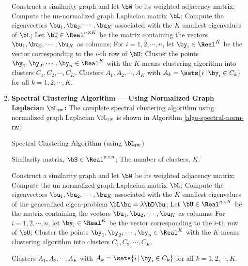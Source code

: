 \documentclass[12pt]{article}
\begin{document}
\begin{enumerate}[label=\textbf{\arabic*.}]
\begin{minipage}{\linewidth}
\begin{algorithm}[H]
\begin{algorithmic}[1]
				\STATE Construct a similarity graph and let $\bW$ be its weighted adjacency matrix; 
				\STATE Compute the un-normalized graph Laplacian matrix $\bL$; 
				\STATE Compute the eigenvectors $\bu_1, \bu_2, \cdots, \bu_K$ associated with the $K$ smallest eigenvalues of $\bL$; 
				\STATE Let $\bU \in \Real^{n \times K}$ be the matrix containing the vectors $\bu_1, \bu_2, \cdots, \bu_K$ as columns; 
				\STATE For $i = 1, 2, \cdots, n$, let $\by_i \in \Real^K$ be the vector corresponding to the $i$-th row of $\bU$; 
				\STATE Cluster the points $\by_1, \by_2, \cdots, \by_n \in \Real^K$ with the $K$-means clustering algorithm into clusters $C_1, C_2, \cdots, C_K$. 
				\RETURN Clusters $A_1, A_2, \cdots, A_K$ with $A_k = \sets{i \,\vert\, \by_i \in C_k}$ for all $k = 1, 2, \cdots, K$. 
			\end{algorithmic}
		\end{algorithm}
	\end{minipage}
	
	\item \textbf{Spectral Clustering Algorithm --- Using Normalized Graph Laplacian $\bL_{\mathrm{rw}}$:} The complete spectral clustering algorithm using normalized graph Laplacian $\bL_{\mathrm{rw}}$ is shown in Algorithm \ref{algo-spectral-norm-rw}. 
	
	\begin{minipage}{\linewidth}
		\begin{algorithm}[H]
		\caption{Spectral Clustering Algorithm (using $\bL_{\mathrm{rw}}$)}\label{algo-spectral-norm-rw}
			\begin{algorithmic}[1]
				\REQUIRE Similarity matrix, $\bS \in \Real^{n \times n}$; 
				\REQUIRE The number of clusters, $K$. 
				
				\STATE Construct a similarity graph and let $\bW$ be its weighted adjacency matrix; 
				\STATE Compute the un-normalized graph Laplacian matrix $\bL$; 
				\STATE Compute the eigenvectors $\bu_1, \bu_2, \cdots, \bu_K$ associated with the $K$ smallest eigenvalues of the generalized eigen-problem $\bL \bu = \lambda \bD \bu$; 
				\STATE Let $\bU \in \Real^{n \times K}$ be the matrix containing the vectors $\bu_1, \bu_2, \cdots, \bu_K$ as columns; 
				\STATE For $i = 1, 2, \cdots, n$, let $\by_i \in \Real^K$ be the vector corresponding to the $i$-th row of $\bU$; 
				\STATE Cluster the points $\by_1, \by_2, \cdots, \by_n \in \Real^K$ with the $K$-means clustering algorithm into clusters $C_1, C_2, \cdots, C_K$. 
				
				\RETURN Clusters $A_1, A_2, \cdots, A_K$ with $A_k = \sets{i \,\vert\, \by_i \in C_k}$ for all $k = 1, 2, \cdots, K$. 
			\end{algorithmic}
		\end{algorithm}
	\end{minipage}
	

\end{enumerate}
\end{document}
